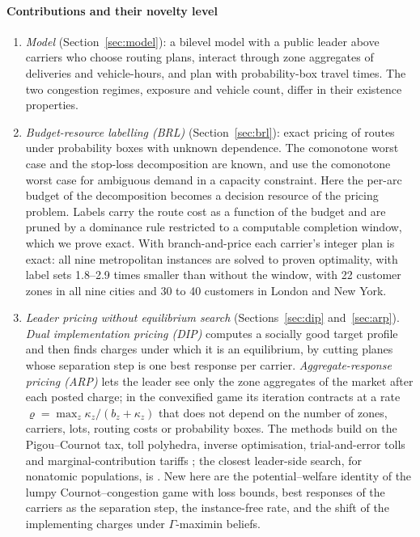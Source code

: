 \documentclass[preprint,11pt]{elsarticle}
\theoremstyle{definition}
\theoremstyle{remark}
\begin{document}
\paragraph{Contributions and their novelty level}
\begin{enumerate}[label=(\roman*),leftmargin=*,itemsep=0pt]
\item \emph{Model} (Section~\ref{sec:model}): a bilevel model with a public leader above carriers who choose routing plans, interact through zone aggregates of deliveries and vehicle-hours, and plan with probability-box travel times. The two congestion regimes, exposure and vehicle count, differ in their existence properties.
\item \emph{Budget-resource labelling (BRL)} (Section~\ref{sec:brl}): exact pricing of routes under probability boxes with unknown dependence. The comonotone worst case and the stop-loss decomposition \citep{Meilijson1979,Tchen1980} are known, and \citet{GhosalHoWiesemann2024} use the comonotone worst case for ambiguous demand in a capacity constraint. Here the per-arc budget of the decomposition becomes a decision resource of the pricing problem. Labels carry the route cost as a function of the budget and are pruned by a dominance rule restricted to a computable completion window, which we prove exact. With branch-and-price each carrier's integer plan is exact: all nine metropolitan instances are solved to proven optimality, with label sets 1.8--2.9 times smaller than without the window, with 22 customer zones in all nine cities and 30 to 40 customers in London and New York.
\item \emph{Leader pricing without equilibrium search} (Sections~\ref{sec:dip} and~\ref{sec:arp}). \emph{Dual implementation pricing (DIP)} computes a socially good target profile and then finds charges under which it is an equilibrium, by cutting planes whose separation step is one best response per carrier. \emph{Aggregate-response pricing (ARP)} lets the leader see only the zone aggregates of the market after each posted charge; in the convexified game its iteration contracts at a rate $\varrho=\max_z\kappa_z/(b_z+\kappa_z)$ that does not depend on the number of zones, carriers, lots, routing costs or probability boxes. The methods build on the Pigou--Cournot tax, toll polyhedra, inverse optimisation, trial-and-error tolls and marginal-contribution tariffs \citep{Buchanan1969,Bergendorff1997,Ahuja2001,Yang2004,Wolpert2001,Sandholm2002,Maheshwari2022}; the closest leader-side search, for nonatomic populations, is \citet{Masiha2026}. New here are the potential--welfare identity of the lumpy Cournot--congestion game with loss bounds, best responses of the carriers as the separation step, the instance-free rate, and the shift of the implementing charges under $\Gamma$-maximin beliefs.

\end{enumerate}
\end{document}
